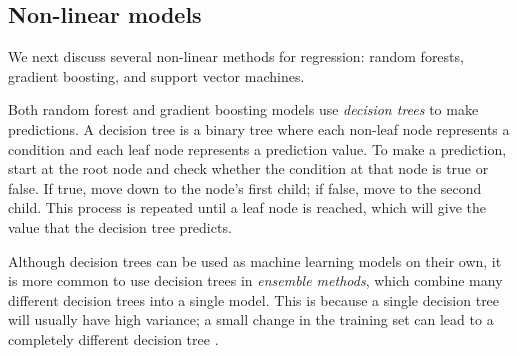 \documentclass[final,onefignum,onetabnum]{siuro210301}
\begin{document}
	\subsection{Non-linear models}
	We next discuss several non-linear methods for regression: random forests, gradient boosting, and support vector machines.
	
	
	Both random forest and gradient boosting models use \textit{decision trees} to make predictions. A decision tree is a binary tree where each non-leaf node represents a condition and each leaf node represents a prediction value. To make a prediction, start at the root node and check whether the condition at that node is true or false. If true, move down to the node's first child; if false, move to the second child. This process is repeated until a leaf node is reached, which will give the value that the decision tree predicts.

	Although decision trees can be used as machine learning models on their own, it is more common to use decision trees in \textit{ensemble methods}, which combine many different decision trees into a single model. This is because a single decision tree will usually have high variance; a small change in the training set can lead to a completely different decision tree \cite{james2013introduction}.
	
\end{document}
